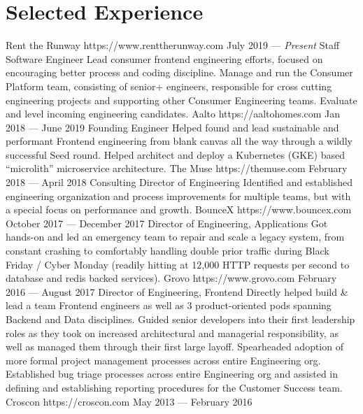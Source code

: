 \documentclass{resume}
\begin{document}
\smallskip

\section{Selected Experience}

\employer
    {Rent the Runway}
    {https://www.renttherunway.com}
    {July 2019 --- \emph{Present}}
    {Staff Software Engineer}
    {Lead consumer frontend engineering efforts, focused on encouraging better process and coding discipline. Manage and run the Consumer Platform team, consisting of senior+ engineers, responsible for cross cutting engineering projects and supporting other Consumer Engineering teams. Evaluate and level incoming engineering candidates.}
\employer
    {Aalto}
    {https://aaltohomes.com}
    {Jan 2018 --- June 2019}
    {Founding Engineer}
    {Helped found and lead sustainable and performant Frontend engineering from blank canvas all the way through a wildly successful Seed round. Helped architect and deploy a Kubernetes (GKE) based ``microlith'' microservice architecture.}
\employer
    {The Muse}
    {https://themuse.com}
    {February 2018 --- April 2018}
    {Consulting Director of Engineering}
    {Identified and established engineering organization and process improvements for multiple teams, but with a special focus on performance and growth.}
\employer
    {BounceX}
    {https://www.bouncex.com}
    {October 2017 --- December 2017}
    {Director of Engineering, Applications}
    {Got hands-on and led an emergency team to repair and scale a legacy system, from constant crashing to comfortably handling double prior traffic during Black Friday / Cyber Monday (readily hitting at 12,000 HTTP requests per second to database and redis backed services).}
\employer
    {Grovo}
    {https://www.grovo.com}
    {February 2016 --- August 2017}
    {Director of Engineering, Frontend}
    {Directly helped build \& lead a team Frontend engineers as well as 3 product-oriented pods spanning Backend and Data disciplines. Guided senior developers into their first leadership roles as they took on increased architectural and managerial responsibility, as well as managed them through their first large layoff. Spearheaded adoption of more formal project management processes across entire Engineering org. Established bug triage processes across entire Engineering org and assisted in defining and establishing reporting procedures for the Customer Success team.}
\employer
    {Croscon}
    {https://croscon.com}
    {May 2013 --- February 2016}
\end{document}
